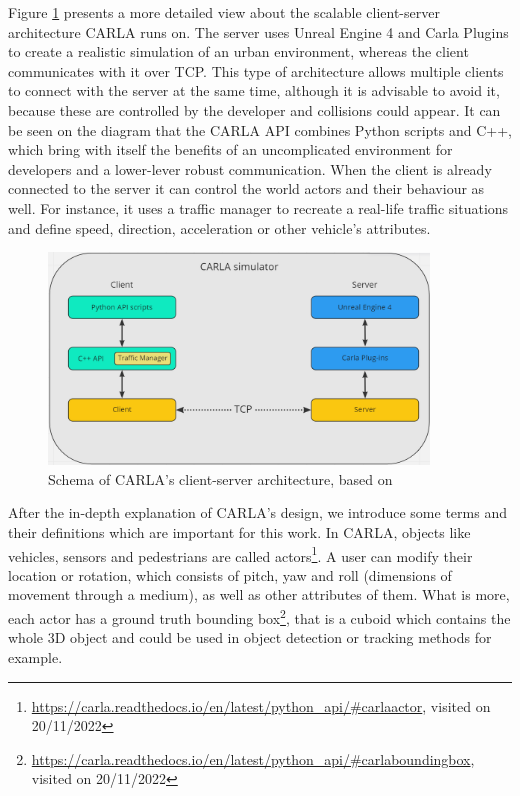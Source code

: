 Figure \ref{fig:carla_arch} presents a more detailed view about the scalable client-server architecture CARLA runs on. The server uses Unreal Engine 4 and Carla Plugins to create a realistic simulation of an urban environment, whereas the client communicates with it over TCP. This type of architecture allows multiple clients to connect with the server at the same time, although it is advisable to avoid it, because these are controlled by the developer and collisions could appear. It can be seen on the diagram that the CARLA API combines Python scripts and C++, which bring with itself the benefits of an uncomplicated environment for developers and a lower-lever robust communication. When the client is already connected to the server it can control the world actors and their behaviour as well. For instance, it uses a traffic manager to recreate a real-life traffic situations and define speed, direction, acceleration or other vehicle's attributes.

\begin{figure} [h]
\centering
\includegraphics[width = 0.9\textwidth]{images/carla_arch.png}
\caption[CARLA's architecture]{Schema of CARLA's client-server architecture, based on \cite{carla_architecture} \label{fig:carla_arch}}
\end{figure}

After the in-depth explanation of CARLA's design, we introduce some terms and their definitions which are important for this work. In CARLA, objects like vehicles, sensors and pedestrians are called actors\footnote{\url{https://carla.readthedocs.io/en/latest/python_api/\#carlaactor}, visited on 20/11/2022}. A user can modify their location or rotation, which consists of pitch, yaw and roll (dimensions of movement through a medium), as well as other attributes of them. What is more, each actor has a ground truth bounding box\footnote{\url{https://carla.readthedocs.io/en/latest/python_api/\#carlaboundingbox}, visited on 20/11/2022}, that is a cuboid which contains the whole 3D object and could be used in object detection or tracking methods for example. 

